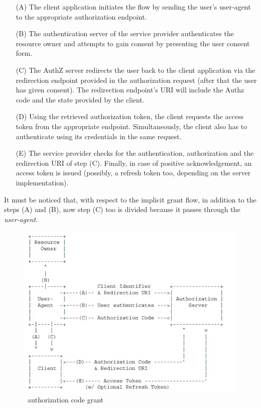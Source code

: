 \begin{itemize}
    \item[(A)]The client application initiates the flow by sending the user's user-agent to the appropriate authorization endpoint.
    \item[(B)]The authentication server of the service provider authenticates the resource owner and attempts to gain consent by presenting the user consent form.
    \item[(C)] The AuthZ server redirects the user back to the client application via the redirection endpoint provided in the authorization request (after that the user has given consent). The redirection endpoint's URI will include the Authz code and the state provided by the client.
    \item[(D)]Using the retrieved authorization token, the client requests the access token from the appropriate endpoint. Simultaneously, the client also has to authenticate using its credentials in the same request.
    \item[(E)] The service provider checks for the authentication, authorization and the redirection URI of step (C). Finally, in case of positive acknowledgement, an access token is issued (possibly, a refresh token too, depending on the server implementation).
\end{itemize}

It must be noticed that, with respect to the implicit grant flow, in addition to the steps (A) and (B), now step (C) too is divided because it passes through the \textit{user-agent}.

\begin{figure}[htbp]
    \centering
    \includegraphics[scale=0.7]{chapters/images/chp2/server.jpg}
    \caption{\ authorization code grant}
    \label{fig:serverflow}
\end{figure}

